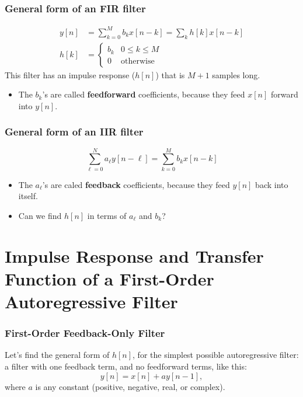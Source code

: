 \documentclass{beamer}
\begin{document}
\begin{frame}
  \frametitle{General form of an FIR filter}
  \begin{align*}
    y[n] &= \sum_{k=0}^{M} b_k x[n-k] = \sum_k h[k]x[n-k]\\
    h[k] &=\begin{cases}
    b_k & 0\le k\le M\\
    0 &\mbox{otherwise}
    \end{cases}
  \end{align*}
  This filter has an impulse response ($h[n]$) that is $M+1$ samples
  long.
  \begin{itemize}
  \item The $b_k$'s are called {\bf feedforward}
    coefficients, because they feed $x[n]$ forward into $y[n]$.
  \end{itemize}
\end{frame}

\begin{frame}
  \frametitle{General form of an IIR filter}
  \[
  \sum_{\ell=0}^N a_\ell y[n-\ell] = \sum_{k=0}^{M} b_k x[n-k]
  \]
  \begin{itemize}
  \item %
    The $a_\ell$'s are caled
    {\bf feedback} coefficients, because they feed $y[n]$ back into
    itself.
  \item Can we find $h[n]$ in terms of $a_\ell$ and $b_k$?
  \end{itemize}
\end{frame}

\section[First-Order]{Impulse Response and Transfer Function of a First-Order Autoregressive Filter}
\setcounter{subsection}{1}

\begin{frame}
  \frametitle{First-Order Feedback-Only Filter}

  Let's find the general form of $h[n]$, for the simplest possible
  autoregressive filter: a filter with one feedback term, and no
  feedforward terms, like this:
  \[
  y[n] = x[n] + ay[n-1],
  \]
  where $a$ is any constant (positive, negative, real, or complex).
\end{frame}
\end{document}

